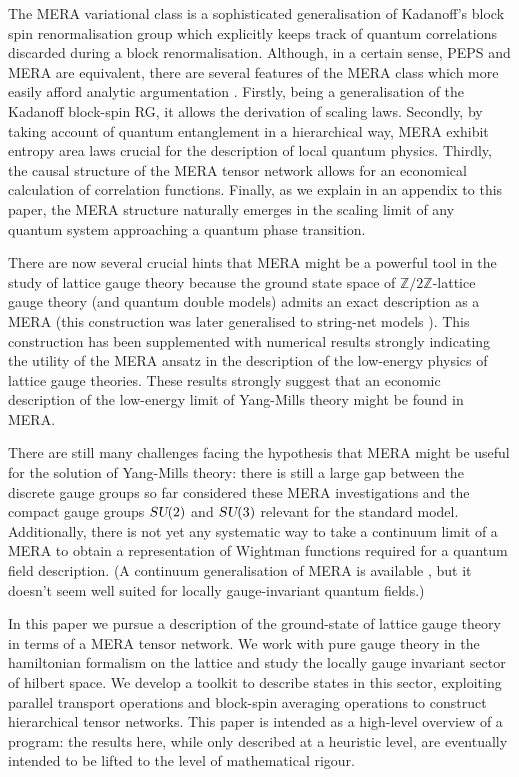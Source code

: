 \documentclass[12pt]{amsart}
\def\su2{\textsl{SU}(2)}
\theoremstyle{definition}
\theoremstyle{remark}
\numberwithin{equation}{section}
\begin{document}
The MERA variational class is a sophisticated generalisation of Kadanoff's block spin renormalisation group \cite{kadanoff:1966a} which explicitly keeps track of quantum correlations discarded during a block renormalisation. Although, in a certain sense, PEPS and MERA are equivalent, there are several features of the MERA class which more easily afford analytic argumentation \cite{vidal:2009a}. Firstly, being a generalisation of the Kadanoff block-spin RG, it allows the derivation of scaling laws. Secondly, by taking account of quantum entanglement in a hierarchical way, MERA exhibit entropy area laws crucial for the description of local quantum physics. Thirdly, the causal structure of the MERA tensor network allows for an economical calculation of correlation functions. Finally, as we explain in an appendix to this paper, the MERA structure naturally emerges in the scaling limit of any quantum system approaching a quantum phase transition.

There are now several crucial hints that MERA might be a powerful tool in the study of lattice gauge theory because the ground state space of $\mathbb{Z}/2\mathbb{Z}$-lattice gauge theory (and quantum double models) admits an exact description as a MERA \cite{aguado:2008a} (this construction was later generalised to string-net models \cite{buerschaper:2009a, koenig:2009a}). This construction has been  supplemented with numerical results \cite{tagliacozzo:2011a} strongly indicating the utility of the MERA ansatz in the description of the low-energy physics of lattice gauge theories. These results strongly suggest that an economic description of the low-energy limit of Yang-Mills theory might be found in MERA.

There are still many challenges facing the hypothesis that MERA might be useful for the solution of Yang-Mills theory: there is still a large gap between the discrete gauge groups so far considered these MERA investigations and the compact gauge groups $\su2$ and $\textsl{SU}(3)$ relevant for the standard model. Additionally, there is not yet any systematic way to take a continuum limit of a MERA to obtain a representation of Wightman functions required for a quantum field description. (A continuum generalisation of MERA is available \cite{haegeman:2011a}, but it doesn't seem well suited for locally gauge-invariant quantum fields.)

In this paper we pursue a description of the ground-state of lattice gauge theory in terms of a MERA tensor network. We work with pure gauge theory in the hamiltonian formalism \cite{kogut:1975a} on the lattice and study the locally gauge invariant sector of hilbert space. We develop a toolkit to describe states in this sector, exploiting parallel transport operations and block-spin averaging operations to construct hierarchical tensor networks. This paper is intended as a high-level overview of a program: the results here, while only described at a heuristic level, are eventually intended to be lifted to the level of mathematical rigour. 
\end{document}
